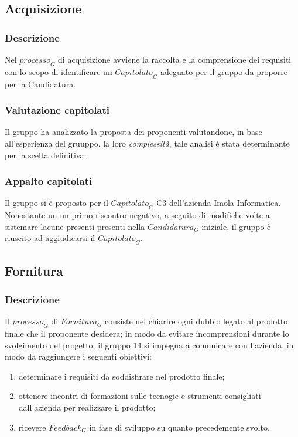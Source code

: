 \subsection{Acquisizione}
\subsubsection{Descrizione}
Nel $\textit{processo}_G$ di acquisizione avviene la raccolta e la comprensione dei requisiti con lo scopo di identificare un $\textit{Capitolato}_G$ adeguato per il gruppo da proporre per la Candidatura.
\subsubsection{Valutazione capitolati}
Il gruppo ha analizzato la proposta dei proponenti valutandone, in base all'esperienza del gruuppo, la loro \textit{complessità}, tale analisi è stata determinante per la scelta definitiva.
\subsubsection{Appalto capitolati}
Il gruppo si è proposto per il $\textit{Capitolato}_G$ C3 dell'azienda Imola Informatica. Nonostante un  un primo riscontro negativo, a seguito di modifiche volte a sistemare lacune presenti  presenti nella $\textit{Candidatura}_G$ iniziale, il gruppo è riuscito ad aggiudicarsi il $\textit{Capitolato}_G$.

\subsection{Fornitura}
\subsubsection{Descrizione}
Il $\textit{processo}_G$ di $\textit{Fornitura}_G$ consiste nel chiarire ogni dubbio legato al prodotto finale che il proponente desidera; in modo da evitare incomprensioni durante lo svolgimento del progetto, il gruppo 14 si impegna a comunicare con l'azienda, in modo da raggiungere i seguenti obiettivi:
\begin{enumerate}
    \item determinare i requisiti da soddisfirare nel prodotto finale;
    \item ottenere incontri di formazioni sulle tecnogie e strumenti consigliati dall'azienda per realizzare il prodotto;
    \item ricevere $\textit{Feedback}_G$ in fase di sviluppo su quanto precedemente svolto.
\end{enumerate}

